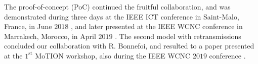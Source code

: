 The proof-of-concept (PoC) continued the fruitful collaboration, and was demonstrated during three days at the IEEE ICT conference in Saint-Malo, France, in June $2018$ \cite{Besson2018ICT}, and later presented at the IEEE WCNC conference in Marrakech, Morocco, in April $2019$ \cite{Besson2019WCNC}.
%
The second model with retransmissions concluded our collaboration with R. Bonnefoi, and resulted to a paper presented at the $1^{\text{st}}$ MoTION workshop, also during the IEEE WCNC $2019$ conference \cite{Bonnefoi2019WCNC}.


